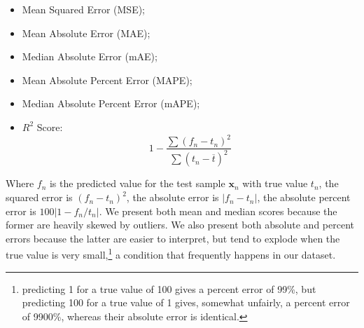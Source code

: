 \documentclass[a4paper]{book}
\begin{document}
\begin{itemize}
\item Mean Squared Error (MSE);
\item Mean Absolute Error (MAE);
\item Median Absolute Error (mAE);
\item Mean Absolute Percent Error (MAPE);
\item Median Absolute Percent Error (mAPE);
\item $R^2$ Score:
$$
1-\frac{\sum (f_n-t_n)^2}{\sum (t_n-\overline{t})^2}
$$
\end{itemize}

Where $f_n$ is the predicted value for the test sample $\bm x_n$ with true value $t_n$, the squared error is $(f_n-t_n)^2$, the absolute error is $\vert f_n-t_n\vert$, the absolute percent error is $100\vert 1-f_n/t_n\vert$. We present both mean and median scores because the former are heavily skewed by outliers. We also present both absolute and percent errors because the latter are easier to interpret, but tend to explode when the true value is very small,\footnote{predicting 1 for a true value of 100 gives a percent error of 99\%, but predicting 100 for a true value of 1 gives, somewhat unfairly, a percent error of 9900\%, whereas their absolute error is identical.} a condition that frequently happens in our dataset.
\end{document}
